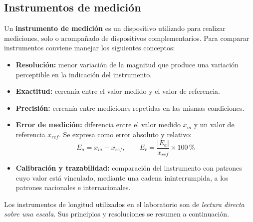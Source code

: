 \documentclass[12pt,a4paper]{article}
\begin{document}
\subsection{Instrumentos de medición}

Un \textbf{instrumento de medición} es un dispositivo utilizado para realizar
mediciones, solo o acompañado de dispositivos complementarios. Para comparar
instrumentos conviene manejar los siguientes conceptos:

\vspace{4pt}

\begin{itemize}
	\item \textbf{Resolución:} menor variación de la magnitud que produce una
	      variación perceptible en la indicación del instrumento.
	\item \textbf{Exactitud:} cercanía entre el valor medido y el valor de
	      referencia.
	\item \textbf{Precisión:} cercanía entre mediciones repetidas en las mismas
	      condiciones.
	\item \textbf{Error de medición:} diferencia entre el valor medido $x_m$ y un
	      valor de referencia $x_{ref}$. Se expresa como error absoluto y
	      relativo:
	      \[
		      E_a = x_m - x_{ref}, \qquad E_r = \frac{|E_a|}{x_{ref}}\times
		      100\,\text{\%}
	      \]
	\item \textbf{Calibración y trazabilidad:} comparación del instrumento con
	      patrones cuyo valor está vinculado, mediante una cadena ininterrumpida,
	      a los patrones nacionales e internacionales.
\end{itemize}

\vspace{4pt}

Los instrumentos de longitud utilizados en el laboratorio son de \emph{lectura
	directa sobre una escala}. Sus principios y resoluciones se resumen a
continuación.

\vspace{4pt}
\end{document}
